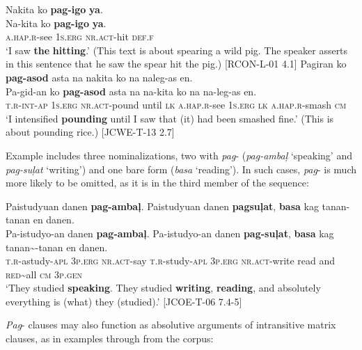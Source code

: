 \ea
\label{ex:thehitting}
Nakita  ko  \textbf{pag-igo}  \textbf{ya}. \smallskip\\
\gll Na-kita  ko  \textbf{pag-igo}  \textbf{ya}. \\
\textsc{a.hap.r}-see  1\textsc{s.erg}  \textsc{nr.act}-hit  \textsc{def.f} \\
\glt ‘I saw \textbf{the} \textbf{hitting}.’ (This text is about spearing a wild pig. The speaker asserts in this sentence that he saw the spear hit the pig.) [RCON-L-01 4.1]
\z
\ea
\label{ex:smashedfine}
Pagiran  ko  \textbf{pag-asod}  asta  na  nakita  ko na  naleg-as  en. \smallskip\\
\gll Pa-gid-an  ko  \textbf{pag-asod}  asta  na  na-kita  ko na  na-leg-as  en. \\
\textsc{t.r}-\textsc{int}-\textsc{ap}  1\textsc{s.erg}  \textsc{nr.act}-pound  until  \textsc{lk}  \textsc{a.hap.r}-see  1\textsc{s.erg}
\textsc{lk}  \textsc{a.hap.r}-smash  \textsc{cm} \\
\glt ‘I intensified \textbf{pounding} until I saw that (it) had been smashed fine.’ (This is about pounding rice.) [JCWE-T-13 2.7]
\z

Example  includes three nominalizations, two with \textit{pag}- (\textit{pag-ambaļ} `speaking' and \textit{pag-suļat} `writing') and one bare form (\textit{basa} ‘reading’). In such cases, \textit{pag}- is much more likely to be omitted, as it is in the third member of the sequence:

\ea
\label{bkm:Ref114832637}
Paistudyuan  danen  \textbf{pag-ambaļ}.  Paistudyuan  danen  \textbf{pagsuļat}, \textbf{basa} kag tanan-tanan  en  danen. \smallskip\\
\gll Pa-istudyo-an  danen  \textbf{pag-ambaļ}.  Pa-istudyo-an  danen  \textbf{pag-suļat}, \textbf{basa}  kag\footnotemark{}  tanan\sim{}-tanan  en  danen. \\
\textsc{t.r}-astudy-\textsc{apl}  3\textsc{p.erg}  \textsc{nr.act}-say  \textsc{t.r}-study-\textsc{apl}  3\textsc{p.erg}  \textsc{nr.act}-write
read  and  \textsc{red}\sim{}all  \textsc{cm}  3\textsc{p.gen} \\
\glt ‘They studied \textbf{speaking}. They studied \textbf{writing}, \textbf{reading}, and absolutely everything is (what) they (studied).’ [JCOE-T-06 7.4-5]
\z

\textit{Pag}{}- clauses may also function as absolutive arguments of intransitive matrix clauses, as in examples  through  from the corpus:

